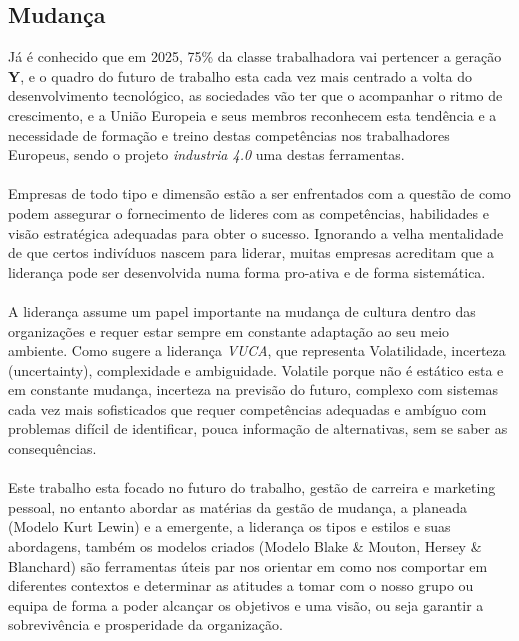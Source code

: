 \subsection{Mudança}
\qquad Já é conhecido que em \textsf{2025}, 75\% da classe trabalhadora vai pertencer a geração \textbf{Y}, e o quadro do futuro de trabalho esta cada vez mais centrado a volta do desenvolvimento tecnológico, as sociedades vão ter que o acompanhar o ritmo de crescimento, e a União Europeia e seus membros reconhecem esta tendência e a necessidade de formação e treino destas competências nos trabalhadores Europeus, sendo o projeto \textit{industria 4.0} uma destas ferramentas.\\
\\
Empresas de todo tipo e dimensão estão a ser enfrentados com a questão de como podem assegurar o fornecimento de lideres com as competências, habilidades e visão estratégica adequadas para obter o sucesso. Ignorando a velha mentalidade de que certos indivíduos nascem para liderar, muitas empresas acreditam que a liderança pode ser desenvolvida numa forma pro-ativa e de forma sistemática.\cite{book_6}\\
\\
A liderança assume um papel importante na mudança de cultura dentro das organizações e requer estar sempre em constante adaptação ao seu meio ambiente. Como sugere a liderança \textit{VUCA}, que representa Volatilidade, incerteza (uncertainty), complexidade e ambiguidade. Volatile porque não é estático esta e em constante mudança, incerteza na previsão do futuro, complexo com sistemas cada vez mais sofisticados que requer competências adequadas e ambíguo com problemas difícil de identificar, pouca informação de alternativas, sem se saber as consequências.\\
\\
Este trabalho esta focado no futuro do trabalho, gestão de carreira e marketing pessoal, no entanto abordar as matérias da gestão de mudança, a planeada (Modelo Kurt Lewin) e a emergente, a liderança os tipos e estilos e suas abordagens, também os modelos criados (Modelo Blake \& Mouton, Hersey \& Blanchard) são ferramentas úteis par nos orientar em como nos comportar em diferentes contextos e determinar as atitudes a tomar com o nosso grupo ou equipa de forma a poder alcançar os objetivos e uma visão, ou seja garantir a sobrevivência e prosperidade da organização.
\newpage
